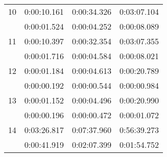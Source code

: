 \documentclass[a4paper,11pt]{report}
\begin{document}
{\begin{center}
\begin{tabular}{c|c|c|c}
\hline
10&
0:00:10.161&
0:00:34.326&
0:03:07.104\\
&
0:00:01.524&
0:00:04.252&
0:00:08.089\\
\hline
11&
0:00:10.397&
0:00:32.354&
0:03:07.355\\
&
0:00:01.716&
0:00:04.584&
0:00:08.021\\
\hline
12&
0:00:01.184&
0:00:04.613&
0:00:20.789\\
&
0:00:00.192&
0:00:00.544&
0:00:00.984\\
\hline
13&
0:00:01.152&
0:00:04.496&
0:00:20.990\\
&
0:00:00.196&
0:00:00.472&
0:00:01.072\\
\hline
14&
0:03:26.817&
0:07:37.960&
0:56:39.273\\
&
0:00:41.919&
0:02:07.399&
0:01:54.752\\
\end{tabular}\\[2mm]
\end{center}

 }
\end{document}
